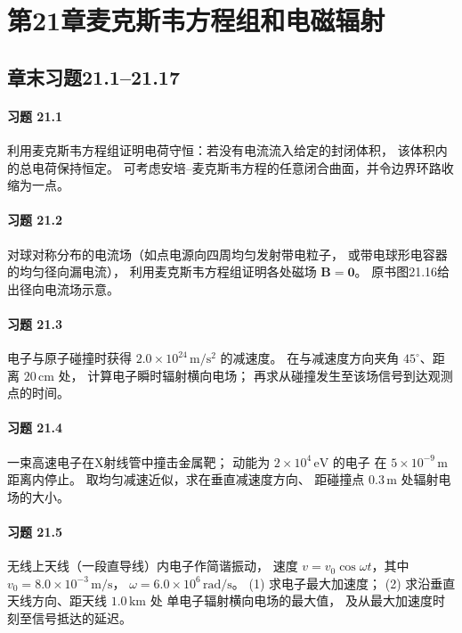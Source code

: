 \section*{第21章\quad 麦克斯韦方程组和电磁辐射}
\subsection*{章末习题21.1--21.17}

\paragraph{习题 21.1}
利用麦克斯韦方程组证明电荷守恒：若没有电流流入给定的封闭体积，
该体积内的总电荷保持恒定。
可考虑安培--麦克斯韦方程的任意闭合曲面，并令边界环路收缩为一点。

\paragraph{习题 21.2}
对球对称分布的电流场（如点电源向四周均匀发射带电粒子，
或带电球形电容器的均匀径向漏电流），
利用麦克斯韦方程组证明各处磁场 \(\boldsymbol B=\boldsymbol 0\)。
原书图21.16给出径向电流场示意。

\paragraph{习题 21.3}
电子与原子碰撞时获得
\(2.0\times10^{24}\,\mathrm{m/s^2}\) 的减速度。
在与减速度方向夹角 \(45^\circ\)、距离 \(20\,\mathrm{cm}\) 处，
计算电子瞬时辐射横向电场；
再求从碰撞发生至该场信号到达观测点的时间。

\paragraph{习题 21.4}
一束高速电子在X射线管中撞击金属靶；
动能为 \(2\times10^4\,\mathrm{eV}\) 的电子
在 \(5\times10^{-9}\,\mathrm m\) 距离内停止。
取均匀减速近似，求在垂直减速度方向、
距碰撞点 \(0.3\,\mathrm m\) 处辐射电场的大小。

\paragraph{习题 21.5}
无线上天线（一段直导线）内电子作简谐振动，
速度 \(v=v_0\cos\omega t\)，其中
\(v_0=8.0\times10^{-3}\,\mathrm{m/s}\)，
\(\omega=6.0\times10^6\,\mathrm{rad/s}\)。
(1) 求电子最大加速度；
(2) 求沿垂直天线方向、距天线 \(1.0\,\mathrm{km}\) 处
单电子辐射横向电场的最大值，
及从最大加速度时刻至信号抵达的延迟。

